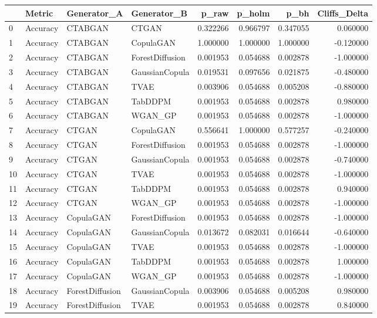 \begin{tabular}{llllrrrr}
\toprule
 & Metric & Generator_A & Generator_B & p_raw & p_holm & p_bh & Cliffs_Delta \\
\midrule
0 & Accuracy & CTABGAN & CTGAN & 0.322266 & 0.966797 & 0.347055 & 0.060000 \\
1 & Accuracy & CTABGAN & CopulaGAN & 1.000000 & 1.000000 & 1.000000 & -0.120000 \\
2 & Accuracy & CTABGAN & ForestDiffusion & 0.001953 & 0.054688 & 0.002878 & -1.000000 \\
3 & Accuracy & CTABGAN & GaussianCopula & 0.019531 & 0.097656 & 0.021875 & -0.480000 \\
4 & Accuracy & CTABGAN & TVAE & 0.003906 & 0.054688 & 0.005208 & -0.880000 \\
5 & Accuracy & CTABGAN & TabDDPM & 0.001953 & 0.054688 & 0.002878 & 0.980000 \\
6 & Accuracy & CTABGAN & WGAN_GP & 0.001953 & 0.054688 & 0.002878 & -1.000000 \\
7 & Accuracy & CTGAN & CopulaGAN & 0.556641 & 1.000000 & 0.577257 & -0.240000 \\
8 & Accuracy & CTGAN & ForestDiffusion & 0.001953 & 0.054688 & 0.002878 & -1.000000 \\
9 & Accuracy & CTGAN & GaussianCopula & 0.001953 & 0.054688 & 0.002878 & -0.740000 \\
10 & Accuracy & CTGAN & TVAE & 0.001953 & 0.054688 & 0.002878 & -1.000000 \\
11 & Accuracy & CTGAN & TabDDPM & 0.001953 & 0.054688 & 0.002878 & 0.940000 \\
12 & Accuracy & CTGAN & WGAN_GP & 0.001953 & 0.054688 & 0.002878 & -1.000000 \\
13 & Accuracy & CopulaGAN & ForestDiffusion & 0.001953 & 0.054688 & 0.002878 & -1.000000 \\
14 & Accuracy & CopulaGAN & GaussianCopula & 0.013672 & 0.082031 & 0.016644 & -0.640000 \\
15 & Accuracy & CopulaGAN & TVAE & 0.001953 & 0.054688 & 0.002878 & -1.000000 \\
16 & Accuracy & CopulaGAN & TabDDPM & 0.001953 & 0.054688 & 0.002878 & 1.000000 \\
17 & Accuracy & CopulaGAN & WGAN_GP & 0.001953 & 0.054688 & 0.002878 & -1.000000 \\
18 & Accuracy & ForestDiffusion & GaussianCopula & 0.003906 & 0.054688 & 0.005208 & 0.980000 \\
19 & Accuracy & ForestDiffusion & TVAE & 0.001953 & 0.054688 & 0.002878 & 0.840000 \\

\end{tabular}
